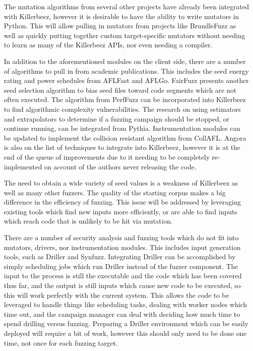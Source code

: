 The mutation algorithms from several other projects have already been
integrated with Killerbeez, however it is desirable to have the ability
to write mutators in Python.  This will allow pulling in mutators from
projects like BrundleFuzz\cite{brundlefuzz} as well as quickly putting
together custom target-specific mutators without needing to learn as many of the Killerbeez
APIs, nor even needing a compiler.

In addition to the aforementioned modules on the client side, there are a number
of algorithms to pull in from academic publications.  This includes the seed
energy rating and power schedules from AFLFast\cite{aflfast} and
AFLGo.\cite{aflgo} FairFuzz presents another seed selection algorithm to bias
seed files toward code segments which are not often executed.\cite{fairfuzz}
The algorithm from PerfFuzz\cite{perffuzz} can be incorporated into
Killerbeez to find algorithmic complexity vulnerabilities. The research on
using estimators and extrapolators to determine if a fuzzing campaign should
be stopped, or continue running, can be integrated from Pythia.\cite{pythia}
Instrumentation modules can be updated to implement the collision resistant
algorithm from CollAFL.\cite{collafl} Angora is also on the list of techniques
to integrate into Killerbeez, however it is at the end of the queue of
improvements due to it needing to be completely re-implemented
on account of the authors never releasing the code.\cite{angora}

The need to obtain a wide variety of seed values is a weakness of Killerbeez
as well as many other fuzzers. The quality of the starting corpus makes a big
difference in the efficiency of fuzzing. This issue will be addressed by leveraging
existing tools which find new inputs more efficiently, or are able to find
inputs which reach code that is unlikely to be hit via mutation.

There are a number of security analysis and fuzzing tools which do not
fit into mutators, drivers, nor instrumentation modules. This includes input
generation tools, such as Driller\cite{driller} and Synfuzz\cite{synfuzz}.
Integrating Driller can be accomplished by simply scheduling \BOINC{} jobs
which run Driller instead of the fuzzer component. The input to the process
is still the executable and the code which has been covered thus far, and the
output is still inputs which cause new code to be executed, so this will work
perfectly with the current system.  This allows the \BOINC{} code to be
leveraged to handle things like scheduling tasks, dealing with worker nodes
which time out, and the campaign manager can deal with deciding how much time
to spend drilling versus fuzzing. Preparing a Driller environment which can
be easily deployed will require a bit of work, however this should only need
to be done one time, not once for each fuzzing target.

